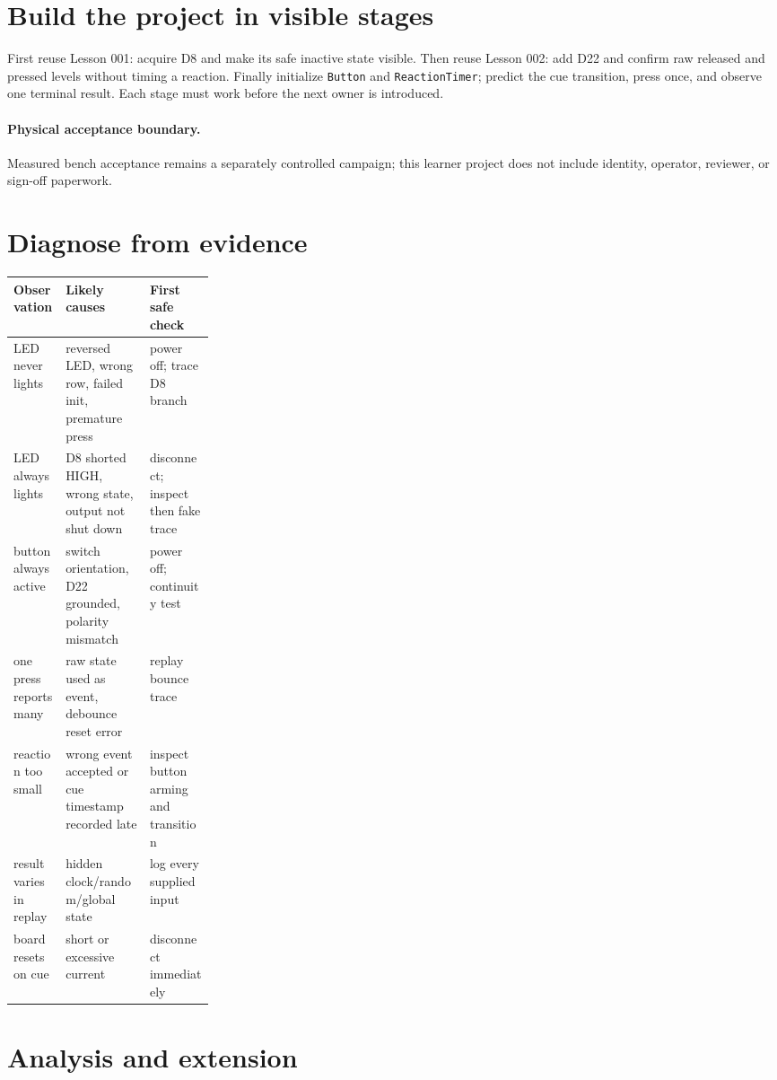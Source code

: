 \documentclass[11pt]{article}
\begin{document}
\section{Build the project in visible stages}

First reuse Lesson 001: acquire D8 and make its safe inactive state visible.
Then reuse Lesson 002: add D22 and confirm raw released and pressed levels
without timing a reaction. Finally initialize \texttt{Button} and
\texttt{ReactionTimer}; predict the cue transition, press once, and observe one
terminal result. Each stage must work before the next owner is introduced.

\paragraph{Physical acceptance boundary.}
Measured bench acceptance remains a separately controlled campaign; this
learner project does not include identity, operator, reviewer, or sign-off
paperwork.
\section{Diagnose from evidence}

\begin{tabularx}{\linewidth}{@{}p{0.26\linewidth}X X@{}}
\toprule
Observation & Likely causes & First safe check\\
\midrule
LED never lights & reversed LED, wrong row, failed init, premature press & power off; trace D8 branch\\
LED always lights & D8 shorted HIGH, wrong state, output not shut down & disconnect; inspect then fake trace\\
button always active & switch orientation, D22 grounded, polarity mismatch & power off; continuity test\\
one press reports many & raw state used as event, debounce reset error & replay bounce trace\\
reaction too small & wrong event accepted or cue timestamp recorded late & inspect button arming and transition\\
result varies in replay & hidden clock/random/global state & log every supplied input\\
board resets on cue & short or excessive current & disconnect immediately\\
\bottomrule
\end{tabularx}

\section{Analysis and extension}
\end{document}
